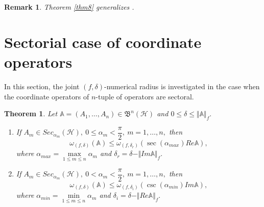 \documentclass[12pt]{article}
\newtheorem{theorem}{Theorem}
\newtheorem{remark}{Remark}
\begin{document}
\begin{remark}
Theorem \ref{thm8} generalizes \textnormal{\cite[Thm. 2.9]{Ismailov2026}}.
\end{remark}
\section{Sectorial case of coordinate operators}
\label{Sec:3}
In this section, the joint $(f,\delta)$-numerical radius is investigated in the case when the coordinate operators of $n$-tuple of operators are sectoral.
\begin{theorem}
\label{thm9}
Let $\mathbb{A} = (A_{1}, \ldots, A_{n}) \in \mathfrak{B}^{n}(\mathcal{H})$ and $ 0\leq\delta\leq \Vert \mathbb{A} \Vert_{f}. $
\begin{enumerate}[label=\upshape{\arabic*.}, ref=\upshape{\arabic*}, labelindent=5pt, leftmargin=*,ref=\upshape{\arabic*.}]
\item \label{item1-thm9} If $ A_{m}\in Sec_{\alpha_{m}}(\mathcal{H}), \ 0\leq \alpha_{m}<\dfrac{\pi}{2}, \ m=1,\ldots ,n, $ then
\[
\omega_{(f,\delta)}(\mathbb{A})\leq \omega_{(f,\delta_{r})}(\sec(\alpha_{max})Re\mathbb{A}),
\]
where $ \alpha_{max}=\max\limits_{1\leq m \leq n}\alpha_{m} $ and $ \delta_{r}=\delta - \Vert Im \mathbb{A} \Vert_{f} .$
\item \label{item2-thm9} If $ A_{m}\in Sec_{\alpha_{m}}(\mathcal{H}), \ 0< \alpha_{m}<\dfrac{\pi}{2}, \ m=1,\ldots ,n, $ then
\[
\omega_{(f,\delta)}(\mathbb{A})\leq \omega_{(f,\delta_{i})}(\csc(\alpha_{min})Im\mathbb{A}),
\]
where $ \alpha_{min}=\min\limits_{1\leq m \leq n}\alpha_{m} $ and $ \delta_{i}=\delta - \Vert Re \mathbb{A} \Vert_{f} .$
\end{enumerate}
\end{theorem}
\end{document}
